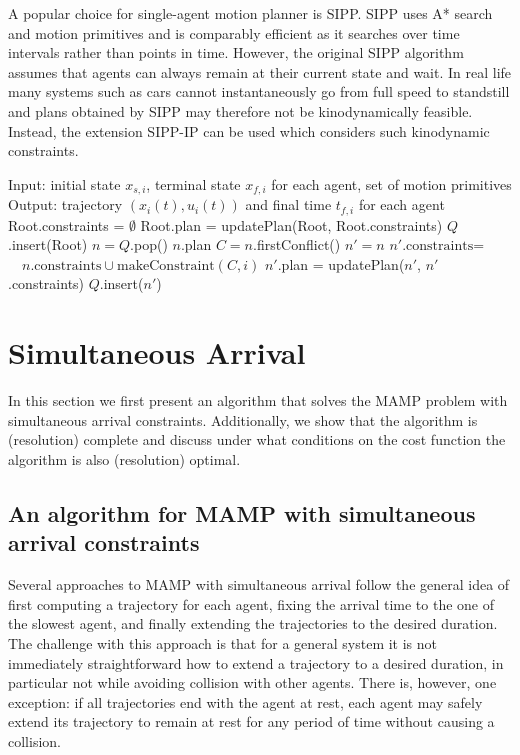 \documentclass[letterpaper, 10 pt, conference]{ieeeconf}  %
\begin{document}
A popular choice for single-agent motion planner is SIPP. SIPP uses A* search and motion primitives and is comparably efficient as it searches over time intervals rather than points in time. However, the original SIPP algorithm assumes that agents can always remain at their current state and wait. In real life many systems such as cars cannot instantaneously go from full speed to standstill and plans obtained by SIPP may therefore not be kinodynamically feasible. Instead, the extension SIPP-IP can be used which considers such kinodynamic constraints.

\begin{algorithm}[tb]
\caption{Conflict-based search (CBS)}
\label{alg:cbs}
\begin{algorithmic}[1]
\State Input: initial state $x_{s, i}$, terminal state $x_{f, i}$ for each agent, set of motion primitives
\State Output: trajectory $(x_i(t), u_i(t))$ and final time $t_{f, i}$ for each agent
\State Root.constraints = $\emptyset$
\State Root.plan = updatePlan(Root, Root.constraints)
\State $Q$.insert(Root)
	\State $n = Q$.pop()
		\State \Return $n$.plan
	\EndIf
	\State $C = n$.firstConflict()
		\State $n' = n$
		\State $n'\text{.constraints=}$
		\mbox{$\quad n.\text{constraints} \cup \text{makeConstraint}(C, i)$}
		\State $n'$.plan = updatePlan($n'$, $n'$.constraints)
		\State $Q$.insert($n'$)
	\EndFor
\EndWhile

\EndProcedure
\end{algorithmic}
\end{algorithm}

\section{Simultaneous Arrival}\label{sec:sim-arrival}

In this section we first present an algorithm that solves the MAMP problem with simultaneous arrival constraints. Additionally, we show that the algorithm is (resolution) complete and discuss under what conditions on the cost function the algorithm is also (resolution) optimal.

\subsection{An algorithm for MAMP with simultaneous arrival constraints}

Several approaches to MAMP with simultaneous arrival follow the general idea of first computing a trajectory for each agent, fixing the arrival time to the one of the slowest agent, and finally extending the trajectories to the desired duration. The challenge with this approach is that for a general system it is not immediately straightforward how to extend a trajectory to a desired duration, in particular not while avoiding collision with other agents. There is, however, one exception: if all trajectories end with the agent at rest, each agent may safely extend its trajectory to remain at rest for any period of time without causing a collision. 
\end{document}
